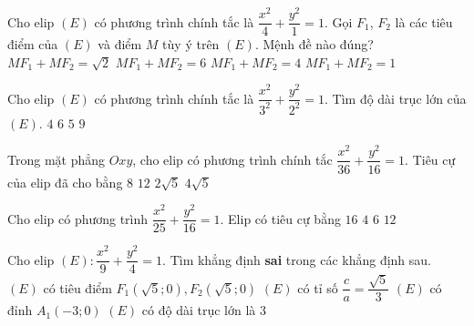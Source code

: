 \begin{ex}%
	Cho elip $(E)$  có phương trình chính tắc là $\dfrac{x^2}{4}+\dfrac{y^2}{1}=1$. Gọi $F_1$, $F_2$ là các tiêu điểm của $(E)$ và điểm $M$ tùy ý trên $(E)$. Mệnh đề nào đúng?
	\choice 
		{  $MF_1+MF_2=\sqrt{2}$}
		{$MF_1+MF_2=6$} 
		{\True $MF_1+MF_2=4$} 
		 {$MF_1+MF_2=1$}
\end{ex}

\begin{ex}%
	Cho elip $(E)$ có phương trình chính tắc là $\dfrac{x^2}{3^2}+\dfrac{y^2}{2^2}=1$. Tìm  độ dài trục lớn của $(E)$.
	\choice 
		{$ 4  $}
		{\True  $ 6 $}
		{$ 5 $} 
		{$ 9 $} 
\end{ex}

\begin{ex}%
	Trong mặt phẳng $Oxy$, cho elip có phương trình chính tắc $\dfrac{x^2}{36}+\dfrac{y^2}{16}=1$. Tiêu  cự của elip đã cho bằng
	 \choice
		{$8$} 
		{$12$} 
		 {$2\sqrt{5}$}
		 {\True $4\sqrt{5}$}
\end{ex}

\begin{ex}%
	Cho elip có phương trình $\dfrac{x^2}{25}+\dfrac{y^2}{16}=1$. Elip có tiêu cự  bằng
	 \choice
		 {$16$}
		{$4$} 
		{\True $6$} 
		 {$12$}
\end{ex}

\begin{ex}%
	Cho elip $(E)\colon \dfrac{x^2}{9}+\dfrac{y^2}{4}=1$. Tìm  khẳng định \textbf{sai} trong các khẳng định sau.
	\choice 
		{$(E)$ có tiêu điểm $F_1\left(\sqrt{5}; 0\right),  F_2\left(\sqrt{5}; 0\right)$}
		{$(E)$ có tỉ số $\dfrac{c}{a}=\dfrac{\sqrt{5}}{3}$} 
		 {$(E)$ có đỉnh $A_1(-3; 0)$}
		{\True $(E)$ có độ dài  trục lớn là $ 3 $}
\end{ex}

